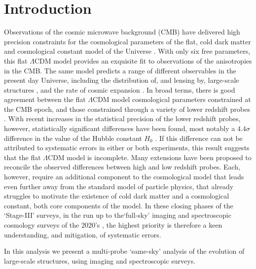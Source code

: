 \section{Introduction}
\label{sec:intro}

Observations of the cosmic microwave background (CMB) have delivered high precision
constraints for the cosmological parameters of the flat, cold dark
matter and cosmological constant model of the Universe
\citep[$\Lambda$CDM,][]{planck/etal:2018}.  With only six free
parameters, this flat $\Lambda$CDM model provides an exquisite fit to observations of
the anisotropies in the CMB.    The same model predicts a range of
different observables in the present day Universe, including the
distribution of, and lensing by, large-scale
structures \citep{peebles/1980,bartelmann/schneider:2001,eisenstein/etal:2005}, and the rate
of cosmic expansion \citep{weinberg/1972}.  In broad terms, there
is good agreement between the flat $\Lambda$CDM model cosmological parameters
constrained at the CMB epoch, and those constrained through a variety of
lower redshift probes \citep[see the discussion in][and references
therein]{planck/etal:2018}.   With recent increases in the statistical
precision of the lower redshift probes,
however, statistically significant differences have been found, most
notably a $4.4\sigma$ difference in the value of the Hubble constant
$H_0$ \citep{riess/etal:2019}.  If this difference can not be
attributed to systematic errors in either or both experiments, this result
suggests that the flat $\Lambda$CDM model is incomplete.  Many
extensions have been proposed to reconcile the observed differences between
high and low redshift probes\citep[see for
example][]{poulin/etal:2018,divalentino/etal:2020}.  Each, however, require
an additional component
to the cosmological model that leads even further away from the
standard model of particle physics, that already struggles to motivate
the existence of cold dark matter and a cosmological constant, both core
components of the model.   In these closing phases of the `Stage-III'
surveys, in the run up to the`full-sky' imaging and spectroscopic
cosmology surveys of the 2020's \citep[Euclid, VRO/LSST and DESI,][]{laureijs/etal:2011,lsst/etal:2009,DESI/etal:2016}, the highest
priority is therefore a keen understanding, and mitigation, of systematic errors.

In this analysis we present a multi-probe `same-sky' analysis of the
evolution of large-scale structures, using imaging and spectroscopic surveys.
